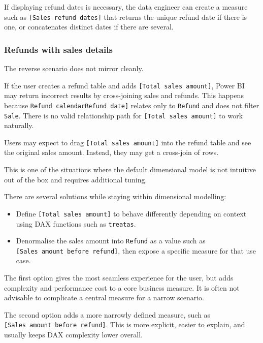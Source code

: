 \documentclass[10pt,openany,10pt]{book}
\providecommand{\tightlist}{%
  \setlength{\itemsep}{0pt}\setlength{\parskip}{0pt}}
\begin{document}
If displaying refund dates is necessary, the data engineer can create a
measure such as \texttt{{[}Sales\ refund\ dates{]}} that returns the
unique refund date if there is one, or concatenates distinct dates if
there are several.

\subsubsection{Refunds with sales
details}\label{refunds-with-sales-details}

The reverse scenario does not mirror cleanly.

If the user creates a refund table and adds
\texttt{{[}Total\ sales\ amount{]}}, Power BI may return incorrect
results by cross-joining sales and refunds. This happens because
\texttt{\textquotesingle{}Refund\ calendar\textquotesingle{}{[}Refund\ date{]}}
relates only to \texttt{\textquotesingle{}Refund\textquotesingle{}} and
does not filter \texttt{\textquotesingle{}Sale\textquotesingle{}}. There
is no valid relationship path for \texttt{{[}Total\ sales\ amount{]}} to
work naturally.

Users may expect to drag \texttt{{[}Total\ sales\ amount{]}} into the
refund table and see the original sales amount. Instead, they may get a
cross-join of rows.

This is one of the situations where the default dimensional model is not
intuitive out of the box and requires additional tuning.

There are several solutions while staying within dimensional modelling:

\begin{itemize}
\tightlist
\item
  Define \texttt{{[}Total\ sales\ amount{]}} to behave differently
  depending on context using DAX functions such as \texttt{treatas}.
\item
  Denormalise the sales amount into
  \texttt{\textquotesingle{}Refund\textquotesingle{}} as a value such as
  \texttt{{[}Sales\ amount\ before\ refund{]}}, then expose a specific
  measure for that use case.
\end{itemize}

The first option gives the most seamless experience for the user, but
adds complexity and performance cost to a core business measure. It is
often not advisable to complicate a central measure for a narrow
scenario.

The second option adds a more narrowly defined measure, such as
\texttt{{[}Sales\ amount\ before\ refund{]}}. This is more explicit,
easier to explain, and usually keeps DAX complexity lower overall.
\end{document}
